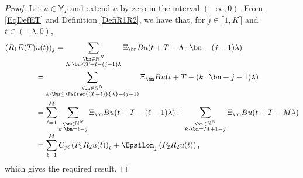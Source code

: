 \begin{proof}
Let $u \in \mathsf Y_T$ and extend $u$ by zero in the interval $(-\infty, 0)$. From \eqref{EqDefET} and Definition \ref{DefiR1R2}, we have that, for $j \in \llbracket 1, K\rrbracket$ and $t \in (-\lambda, 0)$,
\begin{align*}
(R_1 E(T) &u(t))_{j} = \sum_{\substack{\bn \in \mathbb N^N \\ \Lambda \cdot \bn \leq T + t - (j - 1)\lambda}} \Xi_{\bn} B u(t + T - \Lambda \cdot \bn - (j - 1)\lambda)  \\
& = \sum_{\substack{\bn \in \mathbb N^N \\ k \cdot \bn \leq \Psfrac{(T + t)}{\lambda} - (j - 1)}} \Xi_{\bn} B u(t + T - (k \cdot \bn + j - 1)\lambda)  \\
& = \sum_{\ell=1}^M \sum_{\substack{\bn \in \mathbb N^N \\ k \cdot \bn = \ell - j}} \Xi_{\bn} B u(t + T - (\ell - 1)\lambda) + \sum_{\substack{\bn \in \mathbb N^N \\ k \cdot \bn = M+1 - j}} \Xi_{\bn} B u(t + T - M \lambda)  \\[-3pt]
& = \sum_{\ell=1}^M C_{j\ell} \left(P_1 R_2 u(t)\right)_{\ell} + \Epsilon_j \left(P_2 R_2 u(t)\right),
\end{align*}
which gives the required result.
\end{proof}

